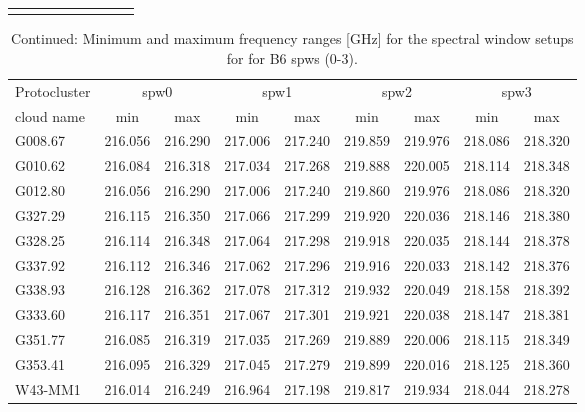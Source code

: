 \documentclass[longauth]{aa} %
\begin{document}
\begin{appendix}
\begin{table}[htbp!]
\begin{tabular}{@{\extracolsep{6pt}}lcccccccc@{}}
\hline \noalign {\smallskip}
\end{tabular}

%
\end{table}
\begin{table}[htbp!]
\ContinuedFloat
\centering
\caption{Continued: Minimum and maximum frequency ranges [GHz] for the spectral window setups for for B6 spws (0-3).}
\begin{tabular}{@{\extracolsep{6pt}}lcccccccc@{}}
\hline \noalign {\smallskip}
Protocluster  & \multicolumn{2}{c}{spw0} & \multicolumn{2}{c}{spw1} & \multicolumn{2}{c}{spw2}& \multicolumn{2}{c}{spw3} \\ 
\cline{2-3}\cline{4-5}\cline{6-7}\cline{8-9}
cloud name\tnote{1}  & min & max  & min & max  & min & max  & min & max  \\
\hline \noalign {\smallskip}
G008.67 & 216.056&216.290&217.006&217.240&219.859&219.976&218.086&218.320 \\
G010.62 & 216.084&216.318&217.034&217.268&219.888&220.005&218.114&218.348 \\
G012.80 & 216.056&216.290&217.006&217.240&219.860&219.976&218.086&218.320 \\
G327.29 & 216.115&216.350&217.066&217.299&219.920&220.036&218.146&218.380 \\
G328.25 & 216.114&216.348&217.064&217.298&219.918&220.035&218.144&218.378 \\
G337.92 & 216.112&216.346&217.062&217.296&219.916&220.033&218.142&218.376 \\
G338.93 & 216.128&216.362&217.078&217.312&219.932&220.049&218.158&218.392 \\
G333.60 & 216.117&216.351&217.067&217.301&219.921&220.038&218.147&218.381 \\
G351.77 & 216.085&216.319&217.035&217.269&219.889&220.006&218.115&218.349 \\
G353.41 & 216.095&216.329&217.045&217.279&219.899&220.016&218.125&218.360 \\
W43-MM1 & 216.014&216.249&216.964&217.198&219.817&219.934&218.044&218.278 \\

\end{tabular}
\end{table}
\end{appendix}
\end{document}
